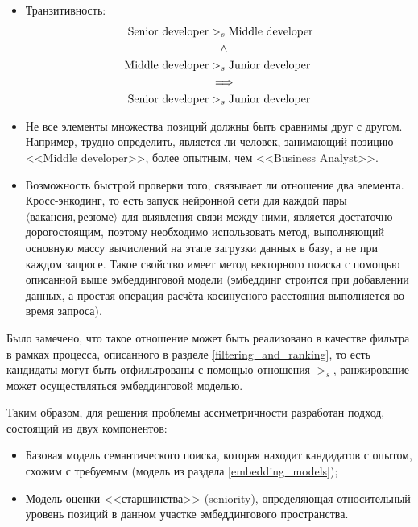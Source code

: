 \documentclass[14pt]{mmcs_article}
\begin{document}
\begin{itemize}
  \item Транзитивность: \\
        \begin{equation*}
          \centering
          \allowdisplaybreaks[1]
          \begin{split}
            \text{Senior developer} & >_{s} \text{Middle developer} \\
                                    & ~~~\land                      \\
            \text{Middle developer} & >_{s} \text{Junior developer} \\
                                    & \implies                      \\
            \text{Senior developer} & >_{s} \text{Junior developer}
          \end{split}
        \end{equation*}
  \item Не все элементы множества позиций должны быть сравнимы друг с другом. Например, трудно определить, является ли человек, занимающий позицию <<Middle developer>>, более опытным, чем <<Business Analyst>>.
  \item Возможность быстрой проверки того, связывает ли отношение два элемента. Кросс-энкодинг, то есть запуск нейронной сети для каждой пары $\langle \text{вакансия}, \text{резюме} \rangle$ для выявления связи между ними, является достаточно дорогостоящим, поэтому необходимо использовать метод, выполняющий основную массу вычислений на этапе загрузки данных в базу, а не при каждом запросе. Такое свойство имеет метод векторного поиска с помощью описанной выше эмбеддинговой модели (эмбеддинг строится при добавлении данных, а простая операция расчёта косинусного расстояния выполняется во время запроса).
\end{itemize}

Было замечено, что такое отношение может быть реализовано в качестве фильтра в рамках процесса, описанного в разделе \ref{filtering_and_ranking}, то есть кандидаты могут быть отфильтрованы с помощью отношения $>_{s}$, ранжирование может осуществляться эмбеддинговой моделью.

Таким образом, для решения проблемы ассиметричности разработан подход, состоящий из двух компонентов:

\begin{itemize}
  \item Базовая модель семантического поиска, которая находит кандидатов с опытом, схожим с требуемым (модель из раздела \ref{embedding_models});
  \item Модель оценки <<старшинства>> (seniority), определяющая относительный уровень позиций в данном участке эмбеддингового пространства.
\end{itemize}
\end{document}

